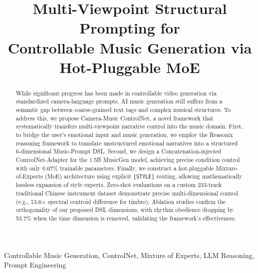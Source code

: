 \documentclass[10pt, conference, letterpaper]{IEEEtran}
\begin{document}
\title{Multi-Viewpoint Structural Prompting for\\ Controllable Music Generation via Hot-Pluggable MoE}

\author{
}

\maketitle

\begin{abstract}
While significant progress has been made in controllable video generation via standardized camera-language prompts, AI music generation still suffers from a semantic gap between coarse-grained text tags and complex musical structures. To address this, we propose Camera-Music ControlNet, a novel framework that systematically transfers multi-viewpoint narrative control into the music domain. First, to bridge the user's emotional input and music generation, we employ the Reasonix reasoning framework to translate unstructured emotional narratives into a structured 6-dimensional Music-Prompt DSL. Second, we design a Concatenation-injected ControlNet-Adapter for the 1.5B MusicGen model, achieving precise condition control with only 0.67\% trainable parameters. Finally, we construct a hot-pluggable Mixture-of-Experts (MoE) architecture using explicit \texttt{[STYLE]} routing, allowing mathematically lossless expansion of style experts. Zero-shot evaluations on a custom 233-track traditional Chinese instrument dataset demonstrate precise multi-dimensional control (e.g., 13.6$\times$ spectral centroid difference for timbre). Ablation studies confirm the orthogonality of our proposed DSL dimensions, with rhythm obedience dropping by 53.7\% when the time dimension is removed, validating the framework's effectiveness.
\end{abstract}

\begin{IEEEkeywords}
Controllable Music Generation, ControlNet, Mixture of Experts, LLM Reasoning, Prompt Engineering
\end{IEEEkeywords}
\end{document}
